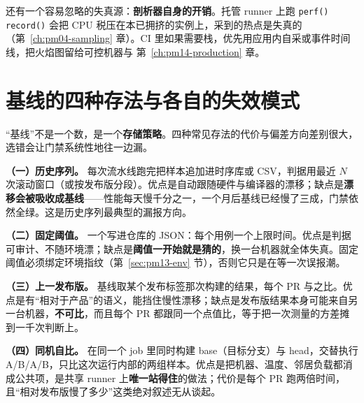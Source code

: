 \documentclass[12pt,a4paper,fontset=fandol]{ctexbook}
\newcommand{\Fn}[1]{\texttt{#1()}}
\begin{document}
还有一个容易忽略的失真源：\textbf{剖析器自身的开销}。托管 runner 上跑 \Fn{perf} \Fn{record} 会把 CPU 税压在本已拥挤的实例上，采到的热点是失真的（第~\ref{ch:pm04-sampling} 章）。CI 里如果需要栈，优先用应用内自采或事件时间线，把火焰图留给可控机器与 第~\ref{ch:pm14-production} 章。

\section{基线的四种存法与各自的失效模式}
\label{sec:pm13-baseline}

``基线''不是一个数，是一个\textbf{存储策略}。四种常见存法的代价与偏差方向差别很大，选错会让门禁系统性地往一边漏。

\textbf{（一）历史序列。} 每次流水线跑完把样本追加进时序库或 CSV，判据用最近 $N$ 次滚动窗口（或按发布版分段）。优点是自动跟随硬件与编译器的漂移；缺点是\textbf{漂移会被吸收成基线}——性能每天慢千分之一，一个月后基线已经慢了三成，门禁依然全绿。这是历史序列最典型的漏报方向。

\textbf{（二）固定阈值。} 一个写进仓库的 JSON：每个用例一个上限时间。优点是判据可审计、不随环境漂；缺点是\textbf{阈值一开始就是猜的}，换一台机器就全体失真。固定阈值必须绑定环境指纹（第~\ref{sec:pm13-env} 节），否则它只是在等一次误报潮。

\textbf{（三）上一发布版。} 基线取某个发布标签那次构建的结果，每个 PR 与之比。优点是有``相对于产品''的语义，能挡住慢性漂移；缺点是发布版结果本身可能来自另一台机器，\textbf{不可比}，而且每个 PR 都跟同一个点值比，等于把一次测量的方差摊到一千次判断上。

\textbf{（四）同机自比。} 在同一个 job 里同时构建 base（目标分支）与 head，交替执行 A/B/A/B，只比这次运行内部的两组样本。优点是把机器、温度、邻居负载都消成公共项，是共享 runner 上\textbf{唯一站得住}的做法；代价是每个 PR 跑两倍时间，且``相对发布版慢了多少''这类绝对叙述无从谈起。
\end{document}
